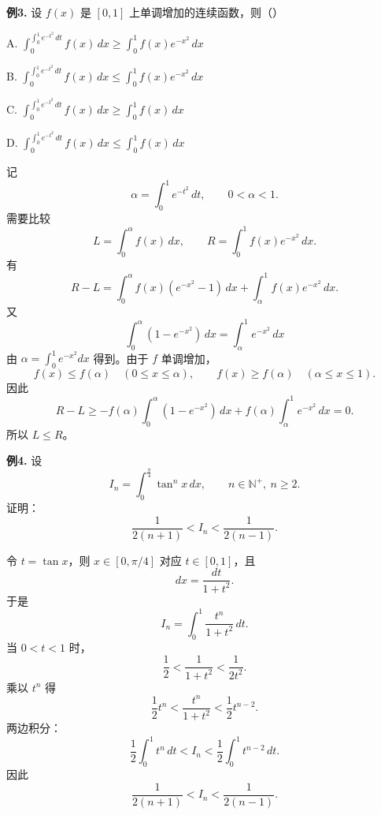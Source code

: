 \begin{problemblock}
\textbf{例3.} 设 \(f(x)\) 是 \([0,1]\) 上单调增加的连续函数，则（\quad）

A. \(\displaystyle \int_0^{\int_0^1e^{-t^2}\,dt}f(x)\,dx
\ge\int_0^1f(x)e^{-x^2}\,dx\)

B. \(\displaystyle \int_0^{\int_0^1e^{-t^2}\,dt}f(x)\,dx
\le\int_0^1f(x)e^{-x^2}\,dx\)

C. \(\displaystyle \int_0^{\int_0^1e^{-t^2}\,dt}f(x)\,dx
\ge\int_0^1f(x)\,dx\)

D. \(\displaystyle \int_0^{\int_0^1e^{-t^2}\,dt}f(x)\,dx
\le\int_0^1f(x)\,dx\)
\end{problemblock}
\begin{solutionblock}
记
\[
\alpha=\int_0^1e^{-t^2}\,dt,\qquad 0<\alpha<1.
\]
需要比较
\[
L=\int_0^\alpha f(x)\,dx,\qquad
R=\int_0^1f(x)e^{-x^2}\,dx.
\]
有
\[
R-L
=\int_0^\alpha f(x)(e^{-x^2}-1)\,dx
+\int_\alpha^1 f(x)e^{-x^2}\,dx.
\]
又
\[
\int_0^\alpha(1-e^{-x^2})\,dx
=\int_\alpha^1e^{-x^2}\,dx
\]
由 \(\alpha=\int_0^1e^{-x^2}dx\) 得到。由于 \(f\) 单调增加，
\[
f(x)\le f(\alpha)\quad(0\le x\le\alpha),
\qquad
f(x)\ge f(\alpha)\quad(\alpha\le x\le1).
\]
因此
\[
R-L
\ge -f(\alpha)\int_0^\alpha(1-e^{-x^2})\,dx
+f(\alpha)\int_\alpha^1e^{-x^2}\,dx=0.
\]
所以 \(L\le R\)。
\end{solutionblock}

\begin{problemblock}
\textbf{例4.} 设
\[
I_n=\int_0^{\frac\pi4}\tan^n x\,dx,\qquad n\in\mathbb{N}^+,\ n\ge2.
\]
证明：
\[
\frac1{2(n+1)}<I_n<\frac1{2(n-1)}.
\]
\end{problemblock}
\begin{solutionblock}
令 \(t=\tan x\)，则 \(x\in[0,\pi/4]\) 对应 \(t\in[0,1]\)，且
\[
dx=\frac{dt}{1+t^2}.
\]
于是
\[
I_n=\int_0^1\frac{t^n}{1+t^2}\,dt.
\]
当 \(0<t<1\) 时，
\[
\frac12<\frac1{1+t^2}<\frac1{2t^2}.
\]
乘以 \(t^n\) 得
\[
\frac12t^n<\frac{t^n}{1+t^2}<\frac12t^{n-2}.
\]
两边积分：
\[
\frac12\int_0^1t^n\,dt<I_n<\frac12\int_0^1t^{n-2}\,dt.
\]
因此
\[
\frac1{2(n+1)}<I_n<\frac1{2(n-1)}.
\]
\end{solutionblock}

